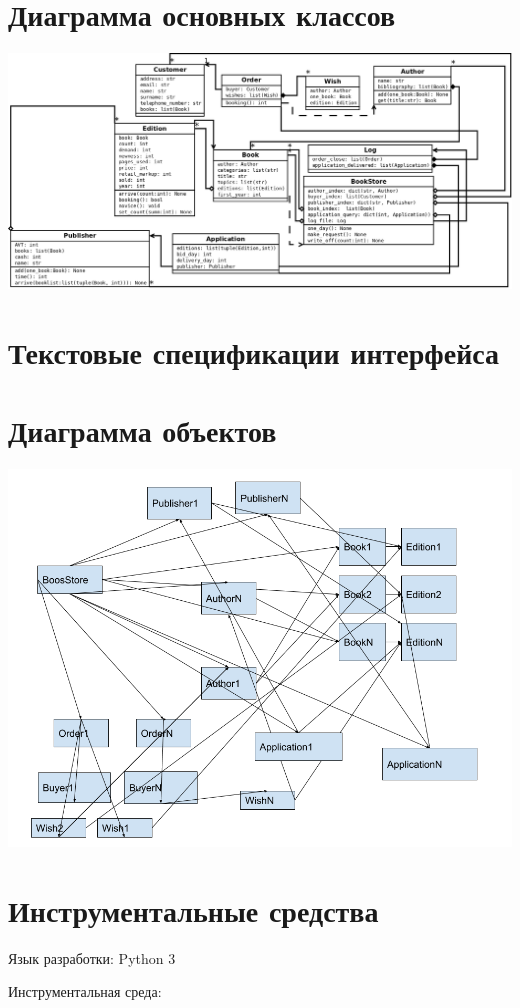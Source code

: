 \documentclass[final,12pt]{article}
\begin{document}
\section{Диаграмма основных классов}
\includegraphics[width=1.0\textwidth]{PyDiaObjects.png}
\section{Текстовые спецификации интерфейса}

\section{Диаграмма объектов}
\includegraphics[width=1.0\textwidth]{objects.png}
\section{Инструментальные средства}
Язык разработки: Python 3

Инструментальная среда:
\end{document}
